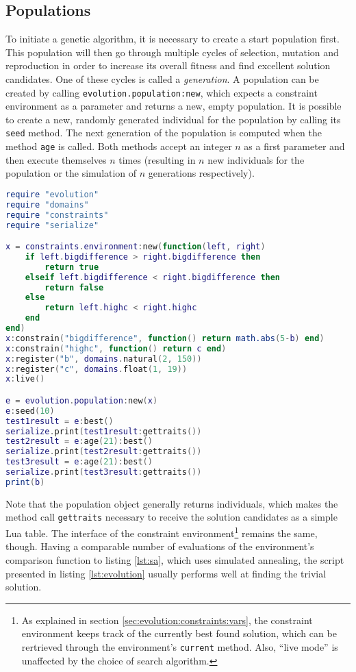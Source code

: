 \subsection{Populations}
\label{sec:evolution:populations}

To initiate a genetic algorithm, it is necessary to create a start population first. This population will then go through multiple cycles of selection, mutation and reproduction in order to increase its overall fitness and find excellent solution candidates. One of these cycles is called a \emph{generation}. A population can be created by calling \texttt{evolution.population:new}, which expects a constraint environment as a parameter and returns a new, empty population. It is possible to create a new, randomly generated individual for the population by calling its \texttt{seed} method. The next generation of the population is computed when the method \texttt{age} is called. Both methods accept an integer $n$ as a first parameter and then execute themselves $n$ times (resulting in $n$ new individuals for the population or the simulation of $n$ generations respectively).

\begin{lstlisting}[language=lua, caption={Solving (and reiterating again) the constraints of listing \ref{lst:sa} with a genetic algorithm of the module \texttt{evolution}.}, label=lst:evolution, name=lst:evolution]
require "evolution"
require "domains"
require "constraints"
require "serialize"

x = constraints.environment:new(function(left, right)
	if left.bigdifference > right.bigdifference then
		return true
	elseif left.bigdifference < right.bigdifference then
		return false
	else
		return left.highc < right.highc
	end
end)
x:constrain("bigdifference", function() return math.abs(5-b) end)
x:constrain("highc", function() return c end)
x:register("b", domains.natural(2, 150))
x:register("c", domains.float(1, 19))
x:live()

e = evolution.population:new(x)
e:seed(10)
test1result = e:best()
serialize.print(test1result:gettraits())
test2result = e:age(21):best()
serialize.print(test2result:gettraits())
test3result = e:age(21):best()
serialize.print(test3result:gettraits())
print(b)
\end{lstlisting}

Note that the population object generally returns individuals, which makes the method call \texttt{gettraits} necessary to receive the solution candidates as a simple Lua table. The interface of the constraint environment\footnote{As explained in section \ref{sec:evolution:constraints:vars}, the constraint environment keeps track of the currently best found solution, which can be rertrieved through the environment's \texttt{current} method. Also, ``live mode'' is unaffected by the choice of search algorithm.} remains the same, though. Having a comparable number of evaluations of the environment's comparison function to listing \ref{lst:sa}, which uses simulated annealing, the script presented in listing \ref{lst:evolution} usually performs well at finding the trivial solution.


